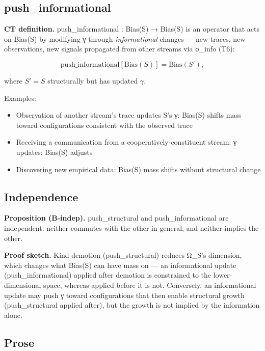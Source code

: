 \documentclass[11pt, openany]{book}
\begin{document}
\subsection{push\_\allowbreak{}informational}

\textbf{CT definition.} push\_\allowbreak{}informational : Bias(S) → Bias(S) is an operator that acts on Bias(S) by modifying γ through \textit{informational} changes --- new traces, new observations, new signals propagated from other streams via σ\_\allowbreak{}info (T6):

$$\text{push\_informational}[\text{Bias}(S)] = \text{Bias}(S'),$$

where $S' = S$ structurally but has updated $\gamma$.

Examples:
\begin{itemize}
\item Observation of another stream's trace updates S's γ: Bias(S) shifts mass toward configurations consistent with the observed trace
\item Receiving a communication from a cooperatively-constituent stream: γ updates; Bias(S) adjusts
\item Discovering new empirical data: Bias(S) mass shifts without structural change
\end{itemize}

\subsection{Independence}

\textbf{Proposition (B-indep).} push\_\allowbreak{}structural and push\_\allowbreak{}informational are independent: neither commutes with the other in general, and neither implies the other.

\textbf{Proof sketch.} Kind-demotion (push\_\allowbreak{}structural) reduces Ω\_\allowbreak{}S's dimension, which changes what Bias(S) can have mass on --- an informational update (push\_\allowbreak{}informational) applied after demotion is constrained to the lower-dimensional space, whereas applied before it is not. Conversely, an informational update may push γ toward configurations that then enable structural growth (push\_\allowbreak{}structural applied after), but the growth is not implied by the information alone.

\subsection{Prose}
\end{document}
